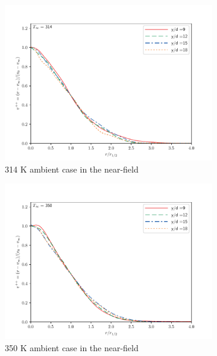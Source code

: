 \begin{figure}[H]
\begin{center}
\begin{subfigure}{0.45\textwidth}
	\includegraphics[scale=.45]{figures/Plots/radial/slices_3/314_ambient/r_vs_v.pdf}
	\caption{314 K ambient case in the near-field} \label{noniso_near_r_vs_v_1}
\end{subfigure}
\begin{subfigure}{0.45\textwidth}
	\includegraphics[scale=.45]{figures/Plots/radial/slices_3/350_ambient/r_vs_v.pdf}
	\caption{350 K ambient case in the near-field} \label{noniso_near_r_vs_v_2}
\end{subfigure}
\vfill
\begin{subfigure}{0.45\textwidth}

\end{subfigure}
\end{center}
\end{figure}
